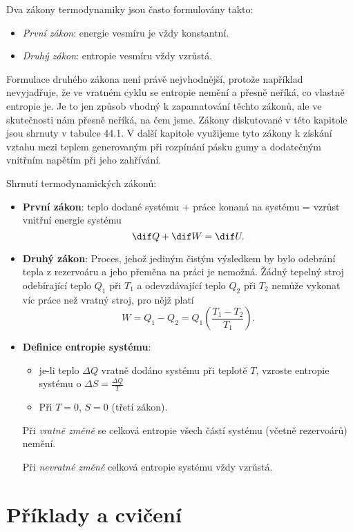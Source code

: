     Dva zákony termodynamiky jsou často formulovány takto:
    \begin{itemize}[noitemsep]
      \item \emph{První zákon}: energie vesmíru je vždy konstantní.
      \item \emph{Druhý zákon}: entropie vesmíru vždy vzrůstá.
    \end{itemize}

    Formulace druhého zákona není právě nejvhodnější, protože například nevyjadřuje, že ve vratném
    cyklu se entropie nemění a přesně neříká, co vlastně entropie je. Je to jen způsob vhodný k
    zapamatování těchto zákonů, ale ve skutečnosti nám přesně neříká, na čem jsme. Zákony
    diskutované v této kapitole jsou shrnuty v tabulce 44.1. V další kapitole využijeme tyto zákony
    k získání vztahu mezi teplem generovaným při rozpínání pásku gumy a dodatečným vnitřním napětím
    při jeho zahřívání.

    \begin{mdframed}[style=mdnote]
      \begin{note}Shrnutí termodynamických zákonů:
        \begin{itemize}[noitemsep]
          \item \textbf{První zákon}: teplo dodané systému + práce konaná na systému = vzrůst
                vnitřní energie systému 
                \begin{equation*}
                  \dif Q + \dif W=\dif U.
                \end{equation*}
          \item \textbf{Druhý zákon}: Proces, jehož jediným čistým výsledkem by bylo odebrání tepla
                z rezervoáru a jeho přeměna na práci je nemožná. Žádný tepelný stroj odebírající
                teplo \(Q_1\) při \(T_1\) a odevzdávající teplo \(Q_2\) při \(T_2\) nemůže vykonat
                víc práce než vratný stroj, pro nějž platí
                \begin{equation*}
                  W=Q_1−Q_2=Q_1\left(\frac{T_1−T_2}{T_1}\right).
                \end{equation*}
          \item \textbf{Definice entropie systému}:
                \begin{itemize}
                  \item je-li teplo \( ΔQ\) vratně dodáno systému při teplotě \(T\), vzroste
                        entropie systému o \(ΔS=\frac{ΔQ}{T}\)
                  \item Při \(T=0\), \(S=0\) (třetí zákon).
                \end{itemize}  
                Při \emph{vratně změně} se celková entropie všech částí systému (včetně rezervoárů)
                nemění.
                
                Při \emph{nevratné změně} celková entropie systému vždy vzrůstá.  
        \end{itemize}
      \end{note}
    \end{mdframed}
  
  \section{Příklady a cvičení}\label{fyz:IchapXLIVsecVII}

